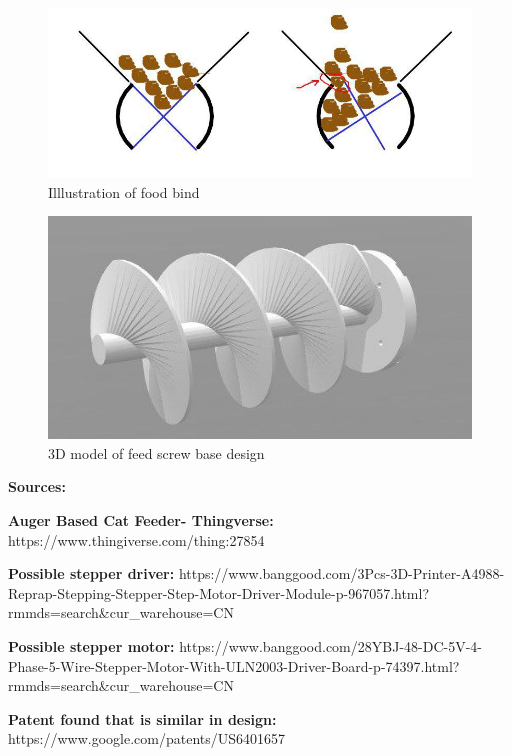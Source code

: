\documentclass[12pt]{article}
\begin{document}
\begin{figure}[H]
\centering
\includegraphics[width=1\textwidth]{bind}
\caption{Illlustration of food bind}
\label{figure:bind}
\end{figure}

\begin{figure}[H]
\centering
\includegraphics[width=.75\textwidth]{feed_screw}
\caption{3D model of feed screw base design}
\label{figure:feed_screw}
\end{figure}
\textbf{Sources:}

\textbf{Auger Based Cat Feeder- Thingverse:} https://www.thingiverse.com/thing:27854

\textbf{Possible stepper driver:} https://www.banggood.com/3Pcs-3D-Printer-A4988-Reprap-Stepping-Stepper-Step-Motor-Driver-Module-p-967057.html?rmmds=search&cur_warehouse=CN

\textbf{Possible stepper motor:} https://www.banggood.com/28YBJ-48-DC-5V-4-Phase-5-Wire-Stepper-Motor-With-ULN2003-Driver-Board-p-74397.html?rmmds=search&cur_warehouse=CN

\textbf{Patent found that is similar in design:} https://www.google.com/patents/US6401657
\end{document}
